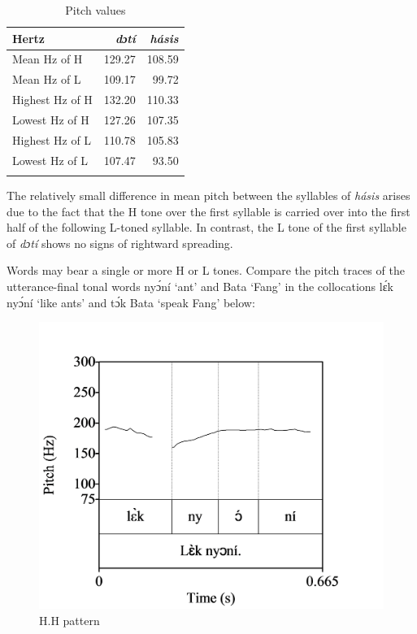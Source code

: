 \begin{table}
\caption{Pitch values}
\label{tab:key:3.1}

\begin{tabularx}{.5\textwidth}{Xrr}
\lsptoprule
Hertz & \itshape dɔtí & \itshape hásis\\
\midrule
Mean Hz of H    & 129.27 & 108.59\\
Mean Hz of L    & 109.17 & 99.72\\
Highest Hz of H & 132.20 & 110.33\\
Lowest Hz of H  & 127.26 & 107.35\\
Highest Hz of L & 110.78 & 105.83\\
Lowest Hz of L  & 107.47 & 93.50\\
\lspbottomrule
\end{tabularx}
\end{table}
The relatively small difference in mean pitch between the syllables of \textit{hásis} arises due to the fact that the H tone over the first syllable is carried over into the first half of the following L-toned syllable. In contrast, the L tone of the first syllable of \textit{dɔtí} shows no signs of rightward spreading. 


Words may bear a single or more H or L tones. Compare the pitch traces of the utterance-final tonal words nyɔ́ní ‘ant’ and Bata ‘Fang’ in the collocations lɛ́k nyɔ́ní ‘like ants’ and tɔ́k Bata ‘speak Fang’ below:


\begin{figure}
\caption{H.H pattern} 
\label{fig:key:3.7}
\includegraphics[height=.3\textheight]{figures/yakpomod-img9.png}
\end{figure}

